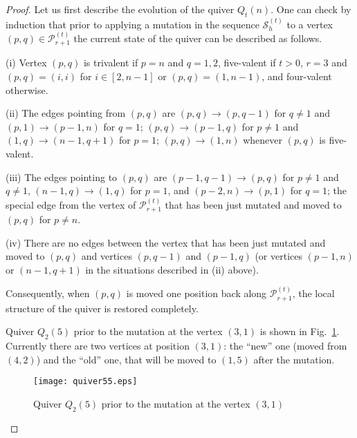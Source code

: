 \documentclass{amsart}
\theoremstyle{definition}
\theoremstyle{remark}
\numberwithin{equation}{section}
\numberwithin{theorem}{section}
\begin{document}
\begin{proof}   
Let us first describe the evolution of the quiver $Q_t(n)$. One can check by induction that prior to 
applying a mutation in the sequence $\mathcal S_h^{(t)}$ to a vertex $(p,q)\in{{\mathcal P}}_{r+1}^{(t)}$ the current state of
the quiver can be described as follows.

(i) Vertex $(p,q)$ is trivalent if $p=n$ and $q=1,2$, five-valent if $t>0$, $r=3$ and $(p,q)=(i,i)$ for
$i\in[2,n-1]$ or $(p,q)=(1,n-1)$, and four-valent otherwise.

(ii) The edges pointing from $(p,q)$ are $(p,q)\to (p,q-1)$ for $q\ne 1$ and $(p,1)\to (p-1,n)$ for $q=1$;
$(p,q)\to (p-1,q)$ for $p\ne 1$ and $(1,q)\to (n-1,q+1)$ for $p=1$; $(p,q)\to (1,n)$ whenever $(p,q)$ is
five-valent.
 
(iii) The edges pointing to $(p,q)$ are $(p-1,q-1)\to(p,q)$ for $p\ne 1$ and  $q\ne 1$, 
$(n-1,q)\to(1,q)$ for $p=1$, and $(p-2,n)\to (p,1)$ 
for $q=1$; the special edge from the vertex of ${{\mathcal P}}_{r+1}^{(t)}$ that has been just mutated and moved to $(p,q)$ for $p\ne n$. 

(iv) There are no edges between the vertex that has been just mutated and moved to $(p,q)$  
and vertices $(p,q-1)$ and $(p-1,q)$ (or vertices $(p-1,n)$ or $(n-1,
q+1)$ in the situations described in (ii) above).

Consequently, when $(p,q)$ is moved one position back along ${{\mathcal P}}_{r+1}^{(t)}$, the local structure of the quiver is restored completely. 

Quiver $Q_2(5)$ prior to the mutation at the vertex $(3,1)$ is shown in Fig.~\ref{fig:q2(5)31}. 
Currently there
are two vertices at position $(3,1)$: the ``new'' one (moved from $(4,2)$) and the ``old'' one, that 
will be moved to $(1,5)$ after the mutation.  

\begin{figure}[ht]
\begin{center}
\texttt{[image: quiver55.eps]}
\caption{Quiver $Q_2(5)$ prior to the mutation at the vertex $(3,1)$}
\label{fig:q2(5)31}
\end{center}
\end{figure}


\end{proof}
\end{document}
